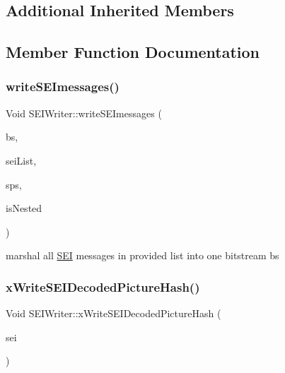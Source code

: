 \subsection*{Additional Inherited Members}


\subsection{Member Function Documentation}
\mbox{\label{class_s_e_i_writer_ab6f3f6ad919794f1b7ad8b3b52788939}} 
\subsubsection{\texorpdfstring{write\+S\+E\+Imessages()}{writeSEImessages()}}
{\footnotesize\ttfamily Void S\+E\+I\+Writer\+::write\+S\+E\+Imessages (\begin{DoxyParamCaption}\item[{\hyperlink{class_t_com_bit_if}{T\+Com\+Bit\+If} \&}]{bs,  }\item[{const S\+E\+I\+Messages \&}]{sei\+List,  }\item[{const \hyperlink{class_t_com_s_p_s}{T\+Com\+S\+PS} $\ast$}]{sps,  }\item[{Bool}]{is\+Nested }\end{DoxyParamCaption})}

marshal all \hyperlink{class_s_e_i}{S\+EI} messages in provided list into one bitstream bs \mbox{\label{class_s_e_i_writer_ade59880722c743ab362cbf0007f88b5b}} 
\subsubsection{\texorpdfstring{x\+Write\+S\+E\+I\+Decoded\+Picture\+Hash()}{xWriteSEIDecodedPictureHash()}}
{\footnotesize\ttfamily Void S\+E\+I\+Writer\+::x\+Write\+S\+E\+I\+Decoded\+Picture\+Hash (\begin{DoxyParamCaption}\item[{const \hyperlink{class_s_e_i_decoded_picture_hash}{S\+E\+I\+Decoded\+Picture\+Hash} \&}]{sei }\end{DoxyParamCaption})\hspace{0.3cm}{\ttfamily [protected]}}


